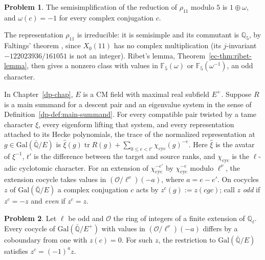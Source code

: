 \documentclass[reqno]{amsart}
\newcounter{chap}
\theoremstyle{definition}
\newtheorem{problem}{Problem}[section]
\newcommand{\Q}{\mathbb{Q}}
\newcommand{\F}{\mathbb{F}}
\newcommand{\Oc}{\mathcal{O}}
\newcommand{\cyc}{\chi_{\mathrm{cyc}}}
\begin{document}
\begin{problem}\label{pr:residual}
The semisimplification of the reduction of \(\rho_{11}\) modulo \(5\) is \(1 \oplus \omega\), and \(\omega(c) = -1\) for every complex conjugation \(c\).
\end{problem}

The representation \(\rho_{11}\) is irreducible: it is semisimple and its commutant is \(\Q_5\), by Faltings' theorem \cite{Fa}, since \(X_0(11)\) has no complex multiplication (its \(j\)-invariant \(-122023936/161051\) is not an integer).  Ribet's lemma, Theorem~\ref{ec-thm:ribet-lemma}, then gives a nonzero class with values in \(\F_5(\omega)\) or \(\F_5(\omega^{-1})\), an odd character.

In Chapter~\ref{dp-chap}, \(E\) is a CM field with maximal real subfield \(E^+\).  Suppose \(R\) is a main summand for a descent pair and an eigenvalue system in the sense of Definition~\ref{dp-def:main-summand}.  For every compatible pair twisted by a tame character \(\xi\), every eigenform lifting that system, and every representation attached to its Hecke polynomials, the trace of the normalized representation at \(g\in\mathrm{Gal}(\bar{\Q}/E)\) is \(\hat\xi(g)\operatorname{tr}R(g)+\sum_{0\le e<t'}\cyc(g)^{-e}\).  Here \(\hat\xi\) is the avatar of \(\xi^{-1}\), \(t'\) is the difference between the target and source ranks, and \(\cyc\) is the \(\ell\)-adic cyclotomic character.  For an extension of \(\cyc^{-e'}\) by \(\cyc^{-e}\) modulo \(\ell^\nu\), the extension cocycle takes values in \((\Oc/\ell^\nu)(-a)\), where \(a = e - e'\).  On cocycles \(z\) of \(\mathrm{Gal}(\bar{\Q}/E)\) a complex conjugation \(c\) acts by \(z^c(g) := z(cgc)\); call \(z\) \emph{odd} if \(z^c = -z\) and \emph{even} if \(z^c = z\).

\begin{problem}\label{pr:parity}
Let \(\ell\) be odd and \(\Oc\) the ring of integers of a finite extension of \(\Q_\ell\).  Every cocycle of \(\mathrm{Gal}(\bar{\Q}/E^+)\) with values in \((\Oc/\ell^\nu)(-a)\) differs by a coboundary from one with \(z(c) = 0\).  For such \(z\), the restriction to \(\mathrm{Gal}(\bar{\Q}/E)\) satisfies \(z^c = (-1)^a z\).
\end{problem}
\end{document}
